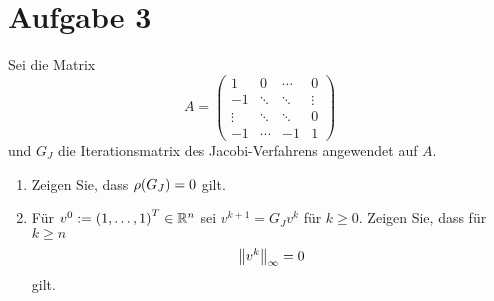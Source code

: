 \documentclass{exercise}
\begin{document}
    \section*{Aufgabe 3}
    
    \begin{problem}
        Sei die Matrix
        \[
            A = \begin{pmatrix}
                1 & 0 & \cdots & 0\\
                -1 & \ddots & \ddots & \vdots\\
                \vdots & \ddots & \ddots & 0\\
                -1 & \cdots & -1 & 1
            \end{pmatrix}
        \]
        und \(G_J\) die Iterationsmatrix des Jacobi-Verfahrens angewendet auf \(A\).
        \begin{enumerate}
            \item Zeigen Sie, dass \(\rho\parentheses*{G_J} = 0\) gilt.
            \item Für \(v^0 := \parentheses*{1, \ldots, 1}^T \in \R^n\) sei \(v^{k + 1} = G_J v^k\) für \(k \ge 0\).
            Zeigen Sie, dass für \(k \ge n\)
            \[
                \norm*{v^k}_\infty = 0
            \]
            gilt.
        \end{enumerate}
    \end{problem}
    
\end{document}
